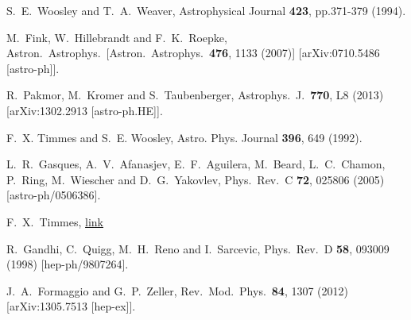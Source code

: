   S.~E.~Woosley and T.~A.~Weaver, Astrophysical Journal {\bf 423}, pp.371-379 (1994).

  M.~Fink, W.~Hillebrandt and F.~K.~Roepke,
  Astron.\ Astrophys.\ 
  [Astron.\ Astrophys.\  {\bf 476}, 1133 (2007)]
  [arXiv:0710.5486 [astro-ph]].


  R.~Pakmor, M.~Kromer and S.~Taubenberger,
  Astrophys.\ J.\  {\bf 770}, L8 (2013)
  [arXiv:1302.2913 [astro-ph.HE]].


 F.~X. Timmes and S.~E. Woosley, Astro. Phys. Journal {\bf 396}, 649 (1992).

  L.~R.~Gasques, A.~V.~Afanasjev, E.~F.~Aguilera, M.~Beard, L.~C.~Chamon, P.~Ring, M.~Wiescher and D.~G.~Yakovlev,
  Phys.\ Rev.\ C {\bf 72}, 025806 (2005)
  [astro-ph/0506386].


F.~X.~Timmes, \href{http://cococubed.asu.edu/code_pages/coldwd.shtml}{link}

  R.~Gandhi, C.~Quigg, M.~H.~Reno and I.~Sarcevic,
  Phys.\ Rev.\ D {\bf 58}, 093009 (1998)
  [hep-ph/9807264].


  J.~A.~Formaggio and G.~P.~Zeller,
  Rev.\ Mod.\ Phys.\  {\bf 84}, 1307 (2012)
  [arXiv:1305.7513 [hep-ex]].


